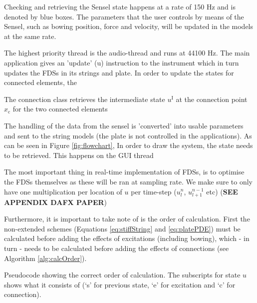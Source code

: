 \documentclass{article}
\begin{document}
Checking and retrieving the Sensel state happens at a rate of 150 Hz and is denoted by blue boxes. The parameters that the user controls by means of the Sensel, such as bowing position, force and velocity, will be updated in the models at the same rate. 

The highest priority thread is the audio-thread and runs at 44100 Hz. The main application gives an 'update' (u) instruction to the instrument which in turn updates the FDSs in its strings and plate. In order to update the states for connected elements, the 

The connection class retrieves the intermediate state $u^\text{I}$ at the connection point $x_\text{c}$ for the two connected elements 

The handling of the data from the sensel is 'converted' into usable parameters and sent to the string models (the plate is not controlled in the applications).
As can be seen in Figure \ref{fig:flowchart}, In order to draw the system, the state needs to be retrieved. This happens on the GUI thread


The most important thing in real-time implementation of FDSs, is to optimise the FDSs themselves as these will be ran at sampling rate. We make sure to only have one multiplication per location of $u$ per time-step ($u_l^n$, $u_{l+1}^{n-1}$ etc) (\textbf{SEE APPENDIX DAFX PAPER}) %

Furthermore, it is important to take note of is the order of calculation. First the non-extended schemes (Equations \eqref{eq:stiffString} and \eqref{eq:platePDE}) must be calculated before adding the effects of excitations (including bowing), which - in turn - needs to be calculated before adding the effects of connections (see Algorithm \ref{alg:calcOrder}).

\begin{algorithm}[h]\label{alg:calcOrder}
 \caption{Pseudocode showing the correct order of calculation. The subscripts for state $u$ shows what it consists of (`s' for previous state, `e' for excitation and `c' for connection).}
\end{algorithm}
\end{document}
